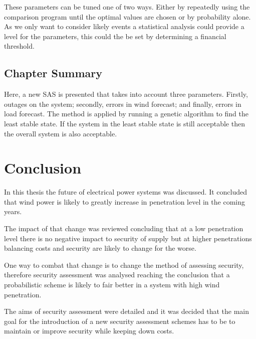 \documentclass[a4paper,oneside,12pt]{report}
\begin{document}
These parameters can be tuned one of two ways. Either by repeatedly using the comparison program until the optimal values are chosen or by probability alone. As we only want to consider likely events a statistical analysis could provide a level for the parameters, this could the be set by determining a financial threshold.


\section{Chapter Summary}

Here, a new SAS is presented that takes into account three parameters. Firstly, outages on the system; secondly, errors in wind forecast; and finally, errors in load forecast. The method is applied by running a genetic algorithm to find the least stable state. If the system in the least stable state is still acceptable then the overall system is also acceptable.










\chapter{Conclusion}

In this thesis the future of electrical power systems was discussed. It concluded that wind power is likely to greatly increase in penetration level in the coming years.

The impact of that change was reviewed concluding that at a low penetration level there is no negative impact to security of supply but at higher penetrations balancing costs and security are likely to change for the worse.

One way to combat that change is to change the method of assessing security, therefore security assessment was analysed reaching the conclusion that a probabilistic scheme is likely to fair better in a system with high wind penetration.

The aims of security assessment were detailed and it was decided that the main goal for the introduction of a new security assessment schemes has to be to maintain or improve security while keeping down costs.
\end{document}
